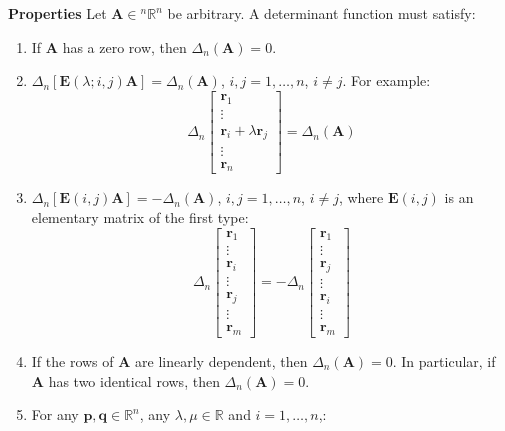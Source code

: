 \documentclass{article}
\newcommand{\bff}[1]{\mathbf{#1}}
\begin{document}
\begin{minipage}[t]{0.45\linewidth}
        \textbf{Properties} Let $\bff{A} \in {^n}\mathbb{R}^n$ be arbitrary. A determinant function must satisfy:
        \begin{enumerate}
            \item If $\bff{A}$ has a zero row, then $\Delta_n(\bff{A})=0$.
            \item $\Delta_n[\bff{E}(\lambda;i,j)\bff{A}] = \Delta_n(\bff{A})$, $i,j=1,\dots,n$, $i\neq j$. For example:
            \begin{equation*}
                \Delta_n \begin{bmatrix}
                    \bff{r}_1 \\ \vdots \\ \bff{r}_i+\lambda \bff{r}_j \\ \vdots \\ \bff{r}_n
                \end{bmatrix} = \Delta_n(\bff{A})
            \end{equation*}
            \item $\Delta_n[\bff{E}(i,j)\bff{A}]=-\Delta_n(\bff{A})$, $i,j=1,\dots, n$, $i\neq j$, where $\bff{E}(i,j)$ is an elementary matrix of the first type:
            \begin{equation*}
                \Delta_n \begin{bmatrix}
                    \bff{r}_1\\\vdots \\ \bff{r}_i \\ \vdots \\ \bff{r}_j \\ \vdots \\ \bff{r}_m
                \end{bmatrix} = -\Delta_n \begin{bmatrix}
                    \bff{r}_1\\\vdots \\ \bff{r}_j \\ \vdots \\ \bff{r}_i \\ \vdots \\ \bff{r}_m
                \end{bmatrix}
            \end{equation*}
            \item If the rows of $\bff{A}$ are linearly dependent, then $\Delta_n(\bff{A})=0$. In particular, if $\bff{A}$ has two identical rows, then $\Delta_n(\bff{A})=0$.
            \item For any $\bff{p},\bff{q} \in \mathbb{R}^n$, any $\lambda,\mu \in \mathbb{R}$ and $i=1,\dots,n$,:

\end{enumerate}
\end{minipage}
\end{document}
